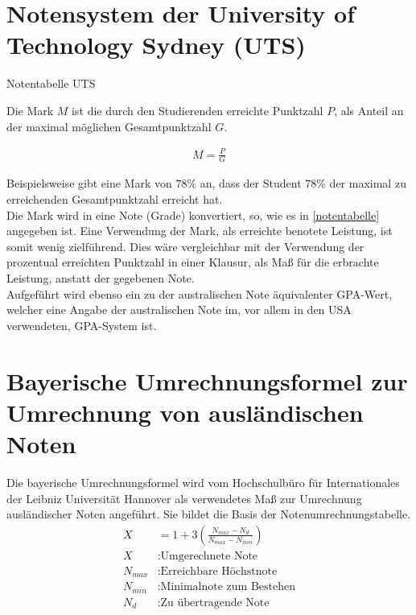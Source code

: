 \documentclass[12pt]{scrartcl}
\begin{document}
\section{Notensystem der University of Technology Sydney (UTS)}
\begin{table}[!ht]
    \centering
    \caption{Notentabelle UTS}
    \label{notentabelle}
\end{table}
Die Mark $M$ ist die durch den Studierenden erreichte Punktzahl $P$, als Anteil an der maximal möglichen Gesamtpunktzahl $G$. 

\begin{align*}
    M = \frac{P}{G}
\end{align*}

Beispielsweise gibt eine Mark von $78 \%$ an, dass der Student $78 \%$ der maximal zu erreichenden Gesamtpunktzahl erreicht hat. \\
Die Mark wird in eine Note (Grade) konvertiert, so, wie es in \autoref{notentabelle} angegeben ist. Eine Verwendung der Mark, als erreichte benotete Leistung, ist somit wenig zielführend. Dies wäre vergleichbar mit der Verwendung der prozentual erreichten Punktzahl in einer Klausur, als Maß für die erbrachte Leistung, anstatt der gegebenen Note. \\
Aufgeführt wird ebenso ein zu der australischen Note äquivalenter GPA-Wert, welcher eine Angabe der australischen Note im, vor allem in den USA verwendeten, GPA-System ist. 
\newpage

\section{Bayerische Umrechnungsformel zur Umrechnung von ausländischen Noten}
Die bayerische Umrechnungsformel wird vom Hochschulbüro für Internationales der Leibniz Universität Hannover als verwendetes Maß zur Umrechnung ausländischer Noten angeführt. Sie bildet die Basis der Notenumrechnungstabelle. \cite{LUHNotenumrechnung}
\begin{align*}
    X &= 1 + 3 \left(\frac{N_{max}-N_d}{N_{max}-N_{min}}\right)\\[1ex]
    X &: \textrm{Umgerechnete Note}\\[0.5ex]
    N_{max} &: \textrm{Erreichbare Höchstnote}\\[0.5ex]
    N_{min} &: \textrm{Minimalnote zum Bestehen} \\[0.5ex]
    N_{d} &: \textrm{Zu übertragende Note}
\end{align*}
\end{document}
